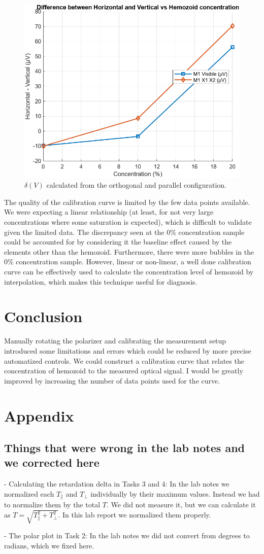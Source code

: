 \documentclass[12pt,a4paper]{article}
\begin{document}
\begin{figure} [H]
    \centering
    \includegraphics[width=0.6\linewidth]{figs/task6_concentration.png}
    \caption{$\delta(V)$ calculated from the orthogonal and parallel configuration.}
    \label{fig:t6}
\end{figure}

The quality of the calibration curve is limited by the few data points available. We were expecting a linear relationship (at least, for not very large concentrations where some saturation is expected), which is difficult to validate given the limited data. The discrepancy seen at the 0\% concentration sample could be accounted for by considering it the baseline effect caused by the elements other than the hemozoid. %
Furthermore, there were more bubbles in the 0\% concentration sample. However, linear or non-linear, a well done calibration curve can be effectively used to calculate the concentration level of hemozoid by interpolation, which makes this technique useful for diagnosis.


\section{Conclusion}

Manually rotating the polarizer and calibrating the measurement setup introduced some limitations and errors which could be reduced by more precise automatized controls.
We could construct a calibration curve that relates the concentration of hemozoid to the measured optical signal. I would be greatly improved by increasing the number of data points used for the curve.

\section{Appendix}

\subsection{Things that were wrong in the lab notes and we corrected here}

- Calculating the retardation delta in Tasks 3 and 4: In the lab notes we normalized each $T_\parallel$ and $T_\perp$ individually by their maximum values. Instead we had to normalize them by the total $T$. We did not measure it, but we can calculate it as $T=\sqrt{T_\parallel^2+T_\perp^2}$. In this lab report we normalized them properly.

- The polar plot in Task 2: In the lab notes we did not convert from degrees to radians, which we fixed here.
\end{document}
